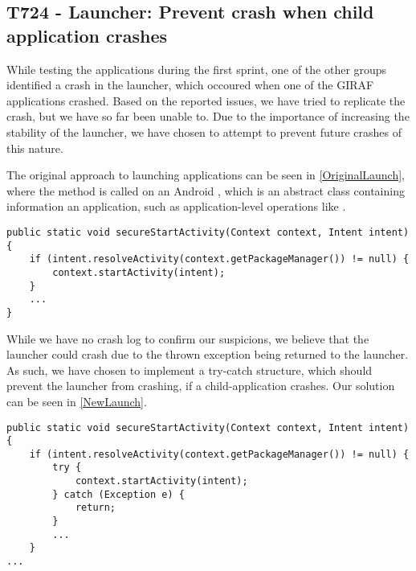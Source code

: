 \subsection{T724 - Launcher: Prevent crash when child application crashes}
While testing the applications during the first sprint, one of the other groups
identified a crash in the launcher, which occoured when one of the GIRAF
applications crashed. Based on the reported issues, we have tried to
replicate the crash, but we have so far been unable to. Due to the importance of
increasing the stability of the launcher, we have chosen to attempt to prevent
future crashes of this nature.\nl

The original approach to launching applications can be seen in
\autoref{OriginalLaunch}, where the  method is called on an
Android , which is an abstract class containing information an
application, such as application-level operations like
.

\begin{minipage}[H]{\linewidth}
\begin{lstlisting}[caption = Original approach to launching applications., label = OriginalLaunch]
public static void secureStartActivity(Context context, Intent intent) {
	if (intent.resolveActivity(context.getPackageManager()) != null) {	
    	context.startActivity(intent);
	}
	...
}
\end{lstlisting}
\end{minipage}

While we have no crash log to confirm our suspicions, we believe that the
launcher could crash due to the thrown exception being returned to the launcher.
As such, we have chosen to implement a try-catch structure, which should prevent
the launcher from crashing, if a child-application crashes. Our solution can be 
seen in \autoref{NewLaunch}.\nl

\begin{minipage}[H]{\linewidth}
\begin{lstlisting}[caption = New approach to launching applications., label = NewLaunch] 
public static void secureStartActivity(Context context, Intent intent) {
	if (intent.resolveActivity(context.getPackageManager()) != null) {
    	try {
        	context.startActivity(intent);
        } catch (Exception e) {
        	return;
        }
        ...
    }
...
\end{lstlisting}
\end{minipage}



